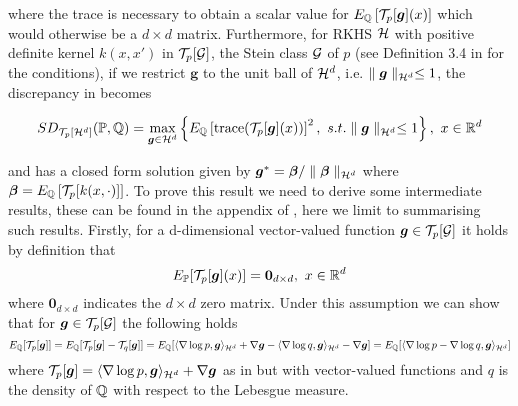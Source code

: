 where the trace is necessary to obtain a scalar value for $E_{\mathbb{Q}}\left[\mathcal{T}_{p}[\boldsymbol{g}](x)\right]$ which would otherwise be a $d \times d$ matrix. Furthermore, for RKHS $\mathcal{H}$ with positive definite kernel $k(x, x')$ in $\mathcal{T}_{p}[\mathcal{G}]$, the Stein class $\mathcal{G}$ of $p$ (see Definition 3.4 in \cite{liu2016kernelized} for the conditions), if we restrict $\boldsymbol{g}$ to the unit ball of $\mathcal{H}^d$, i.e. $\parallel \boldsymbol{g} \parallel_{\mathcal{H}^d} \leq 1$, the discrepancy in  becomes

\begin{equation}\label{stein_discrepancy_rkhs}
SD_{\mathcal{T}_p[\mathcal{H}^d]}(\mathbb{P}, \mathbb{Q}) = \max_{\boldsymbol{g} \in \mathcal{H}^d}\left\{E_{\mathbb{Q}}\left[\text{trace}(\mathcal{T}_{p}[\boldsymbol{g}](x))\right]^2, \ s.t. \parallel \boldsymbol{g}\parallel_{\mathcal{H}^d} \leq 1\right \},\ x \in \mathbb{R}^d
\end{equation}

and has a closed form solution given by $\boldsymbol{g}^* = \boldsymbol{\beta}/\parallel \boldsymbol{\beta} \parallel_{\mathcal{H}^d}$ where $\boldsymbol{\beta} = E_{\mathbb{Q}}\left[\mathcal{T}_p[k(x, \cdot)]\right]$. To prove this result we need to derive some intermediate results, these can be found in the appendix of \cite{liu2016kernelized}, here we limit to summarising such results. Firstly, for a d-dimensional vector-valued function $\boldsymbol{g} \in \mathcal{T}_p[\mathcal{G}]$ it holds by definition that
\begin{equation*}
E_{\mathbb{P}}[\mathcal{T}_p[\boldsymbol{g}](x)] = \boldsymbol{0}_{d \times d}, \ x \in \mathbb{R}^d
\end{equation*}
where $\boldsymbol{0}_{d \times d}$ indicates the $d \times d$ zero matrix. Under this assumption we can show that for $\boldsymbol{g} \in \mathcal{T}_p[\mathcal{G}]$ the following holds
\begin{equation*}
E_{\mathbb{Q}}[\mathcal{T}_p[\boldsymbol{g}]] = E_{\mathbb{Q}}[\mathcal{T}_p[\boldsymbol{g}] - \mathcal{T}_q[\boldsymbol{g}]] = E_{\mathbb{Q}}[\langle \nabla \log p, \boldsymbol{g} \rangle_{\mathcal{H}^d} + \nabla \boldsymbol{g} - \langle \nabla \log q, \boldsymbol{g} \rangle_{\mathcal{H}^d} - \nabla \boldsymbol{g}] =  E_{\mathbb{Q}}[\langle \nabla\log p - \nabla \log q, \boldsymbol{g} \rangle_{\mathcal{H}^d}]
\end{equation*}
where $\mathcal{T}_p[\boldsymbol{g}] = \langle \nabla \log p, \boldsymbol{g} \rangle_{\mathcal{H}^d} + \nabla \boldsymbol{g}$ as in  but with vector-valued functions and $q$ is the density of $\mathbb{Q}$ with respect to the Lebesgue measure.
